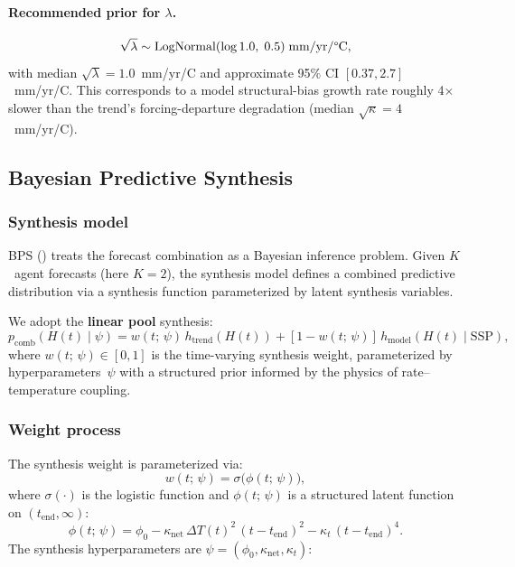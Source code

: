 \documentclass[11pt]{article}
\newcommand{\dT}{\Delta T}
\newcommand{\tend}{t_{\mathrm{end}}}
\begin{document}
\paragraph{Recommended prior for $\lambda$.}
\begin{equation}
  \sqrt{\lambda} \sim \mathrm{LogNormal}(\log 1.0,\; 0.5) \;\text{mm/yr/\textdegree C},
  \label{eq:lambda_prior}
\end{equation}
with median $\sqrt{\lambda} = 1.0$~mm/yr/\textdegree C and approximate 95\% CI $[0.37, 2.7]$~mm/yr/\textdegree C.  This corresponds to a model structural-bias growth rate roughly 4$\times$ slower than the trend's forcing-departure degradation (median $\sqrt{\kappa} = 4$~mm/yr/\textdegree C).


\subsection{Bayesian Predictive Synthesis}
\label{sec:bps}

\subsubsection{Synthesis model}

BPS (\citealt{McAlinn2019}) treats the forecast combination as a Bayesian inference problem.  Given $K$~agent forecasts (here $K = 2$), the synthesis model defines a combined predictive distribution via a synthesis function parameterized by latent synthesis variables.

We adopt the \textbf{linear pool} synthesis:
\begin{equation}
  p_{\mathrm{comb}}(H(t) \mid \psi) = w(t;\,\psi)\,h_{\mathrm{trend}}(H(t)) + [1 - w(t;\,\psi)]\,h_{\mathrm{model}}(H(t) \mid \mathrm{SSP}),
  \label{eq:bps_synthesis}
\end{equation}
where $w(t;\,\psi) \in [0, 1]$ is the time-varying synthesis weight, parameterized by hyperparameters~$\psi$ with a structured prior informed by the physics of rate--temperature coupling.

\subsubsection{Weight process}
\label{sec:weight_process}

The synthesis weight is parameterized via:
\begin{equation}
  w(t;\,\psi) = \sigma\!\big(\phi(t;\,\psi)\big),
  \label{eq:weight_logistic}
\end{equation}
where $\sigma(\cdot)$ is the logistic function and $\phi(t;\,\psi)$ is a structured latent function on $(t_{\mathrm{end}}, \infty)$:
\begin{equation}
  \phi(t;\,\psi) = \phi_0 - \kappa_{\mathrm{net}}\,\dT(t)^2\,(t - \tend)^2 - \kappa_t\,(t - \tend)^4.
  \label{eq:phi_process}
\end{equation}
The synthesis hyperparameters are $\psi = (\phi_0, \kappa_{\mathrm{net}}, \kappa_t)$:
\end{document}
